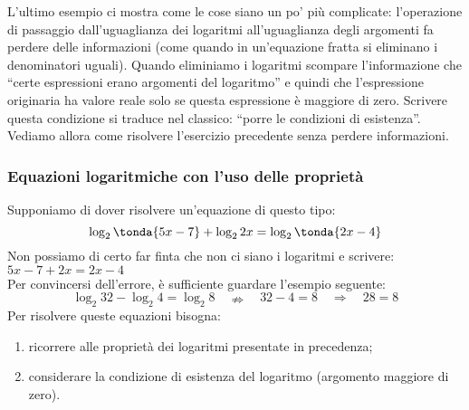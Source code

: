 L'ultimo esempio ci mostra come le cose siano un po' più complicate: 
l'operazione di passaggio dall'uguaglianza dei logaritmi all'uguaglianza 
degli 
argomenti fa perdere delle informazioni (come quando in un'equazione fratta 
si 
eliminano i denominatori uguali). 
Quando eliminiamo i logaritmi scompare l'informazione che ``certe 
espressioni 
erano argomenti del logaritmo'' e quindi che l'espressione originaria ha 
valore 
reale solo se questa espressione è maggiore di zero. 
Scrivere questa condizione si traduce nel classico: ``porre le condizioni 
di esistenza''.
Vediamo allora come risolvere l'esercizio precedente senza perdere 
informazioni.



\subsubsection{Equazioni logaritmiche con l'uso delle proprietà}
\label{subsubsec:esplog_eq_log_proprieta}

\noindent Supponiamo di dover risolvere un'equazione di questo tipo:
\[\log_2\tonda{5x -7} + \log_2{2x}= \log_2\tonda{2x -4}\]
Non possiamo di certo far finta che non ci siano i logaritmi e scrivere:
\(5x -7 + 2x = 2x -4\)\\
Per convincersi dell'errore, è sufficiente guardare l'esempio seguente:
\[\log_2 32 -\log_2 4 = \log_2 8 \quad \nRightarrow\quad 32 -4 = 8 \quad 
\Rightarrow\quad 28 = 8\]
Per risolvere queste equazioni bisogna:
\begin{enumerate}
 \item ricorrere alle proprietà dei logaritmi presentate in precedenza;
 \item considerare la condizione di esistenza del logaritmo 
 (argomento maggiore di zero).
\end{enumerate}

